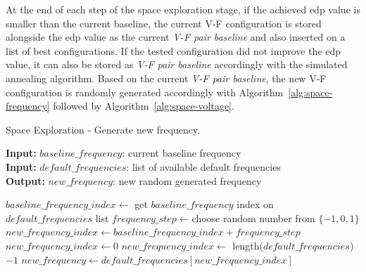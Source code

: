 At the end of each step of the space exploration stage, if the achieved \acrshort{edp} value is smaller than the current baseline, the current V-F configuration is stored alongside the \acrshort{edp} value as the current \textit{V-F pair baseline} and also inserted on a list of best configurations. If the tested configuration did not improve the \acrshort{edp} value, it can also be stored as \textit{V-F pair baseline} accordingly with the simulated annealing algorithm. Based on the current \textit{V-F pair baseline}, the new V-F configuration is randomly generated accordingly with Algorithm~\ref{alg:space-frequency} followed by Algorithm~\ref{alg:space-voltage}.

\begin{algorithm}
    \caption{Space Exploration - Generate new frequency.}
    \label{alg:space-frequency}
 \hspace*{\algorithmicindent} \textbf{Input:} $baseline\_frequency$: current baseline frequency \\
 \hspace*{\algorithmicindent} \textbf{Input:} $default\_frequencies$: list of available default frequencies \\
 \hspace*{\algorithmicindent} \textbf{Output:} $new\_frequency$: new random generated frequency
\begin{algorithmic}
\STATE $baseline\_frequency\_index \leftarrow$ get $baseline\_frequency$ index on $default\_frequencies$ list
\STATE $frequency\_step \leftarrow $choose random number from $\{-1, 0, 1\}$
\STATE $new\_frequency\_index \leftarrow baseline\_frequency\_index + frequency\_step$
\STATE $new\_frequency\_index \leftarrow 0$
\STATE $new\_frequency\_index \leftarrow$ length($default\_frequencies$) $-1$
\ENDIF
\STATE $new\_frequency \leftarrow default\_frequencies[new\_frequency\_index]$
\end{algorithmic}
\end{algorithm}

